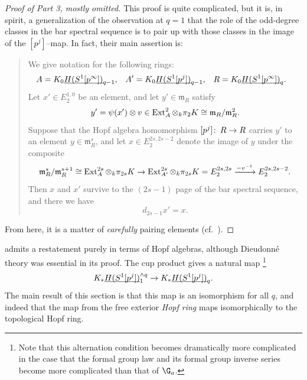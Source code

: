 \begin{proof}[Proof of Part 3, mostly omitted]
This proof is quite complicated, but it is, in spirit, a generalization of the observation at \(q = 1\) that the role of the odd-degree classes in the bar spectral sequence is to pair up with those classes in the image of the \([p^j]\)--map.
In fact, their main assertion is:
\begin{siderules}
\begin{quote}
We give notation for the following rings:
\begin{align*}
A & = K_0 \OS{H(S^1[p^\infty])}{q-1}, &
A' & = K_0 \OS{H(S^1[p^j])}{q-1}, &
R & = K_0 \OS{H(S^1[p^\infty])}{q}.
\end{align*}
Let \(x' \in E_2^{1, 0}\) be an element, and let \(y' \in \mathfrak m_R\) satisfy \[y' = \psi(x') \otimes v \in \operatorname{Ext}^2_A \otimes_k \pi_2 K \cong \mathfrak m_R / \mathfrak m_R^2.\]
Suppose that the Hopf algebra homomorphism \([p^j]\colon\thinspace R \to R\) carries \(y'\) to an element \(y \in \mathfrak m_R^s\), and let \(x \in E_2^{2s, 2s-2}\) denote the image of \(y\) under the composite \[\mathfrak m_R^s / \mathfrak m_R^{s+1} \cong \operatorname{Ext}_A^{2s} \otimes_k \pi_{2s} K \to \operatorname{Ext}_{A'}^{2s} \otimes_k \pi_{2s} K = E_2^{2s, 2s} \xrightarrow{-v^{-1}} E_2^{2s, 2s-2}.\]
Then \(x\) and \(x'\) survive to the \((2s - 1)\){\th} page of the bar spectral sequence, and there we have \[d_{2s-1} x' = x.\]
\end{quote}
\end{siderules}
From here, it is a matter of \emph{carefully} pairing elements (cf.\ \cite[pg.\ 60]{HopkinsLurie}).
\end{proof}

\begin{remark}
 admits a restatement purely in terms of Hopf algebras, although Dieudonn\'e theory was essential in its proof.
The cup product gives a natural map%
\footnote{%
Note that this alternation condition becomes dramatically more complicated in the case that the formal group law and its formal group inverse series become more complicated than that of \(\G_a\).
}
\[K_* \OS{H(S^1[p^j])}{1}^{\wedge q} \to K_* \OS{H(S^1[p^j])}{q}.\]
The main result of this section is that this map is an isomorphism for all \(q\), and indeed that the map from the free exterior \emph{Hopf ring} maps isomorphically to the topological Hopf ring.
\end{remark}

